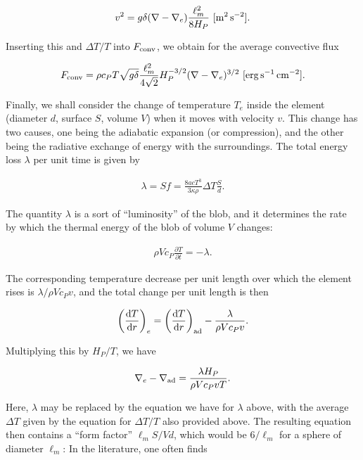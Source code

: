 \documentclass[a4paper,10pt]{article}
\begin{document}
\begin{align*}
    v^2 = g\delta(\nabla-\nabla_e)\frac{\ell_m^2}{8H_P} ~ [{\rm m^2\,s^{-2}}].
\end{align*}

{\noindent}Inserting this and $\Delta T/T$ into $F_{\rm conv}$, we obtain for the average convective flux

\begin{align*}
    F_{\rm conv} = \rho c_PT\sqrt{g\delta}\frac{\ell_m^2}{4\sqrt{2}} H_P^{-3/2}(\nabla-\nabla_e)^{3/2} ~ [{\rm erg\,s^{-1}\,cm^{-2}}].
\end{align*}

{\noindent}Finally, we shall consider the change of temperature $T_e$ inside the element (diameter $d$, surface $S$, volume $V$) when it moves with velocity $v$. This change has two causes, one being the adiabatic expansion (or compression), and the other being the radiative exchange of energy with the surroundings. The total energy loss $\lambda$ per unit time is given by

\begin{align*}
    \lambda = Sf = \frac{8acT^3}{3\kappa\rho}\Delta T\frac{S}{d}.
\end{align*}

{\noindent}The quantity $\lambda$ is a sort of ``luminosity'' of the blob, and it determines the rate by which the thermal energy of the blob of volume $V$ changes:

\begin{align*}
    \rho Vc_P \frac{\partial T}{\partial t} = -\lambda.
\end{align*}

The corresponding temperature decrease per unit length over which the element rises is $\lambda/\rho Vc_Pv$, and the total change per unit length is then

\begin{align*}
    \left(\frac{{\rm d}T}{{\rm d}r}\right)_e = \left(\frac{{\rm d}T}{{\rm d}r}\right)_{\rm ad} - \frac{\lambda}{\rho Vc_Pv}.
\end{align*}

{\noindent}Multiplying this by $H_P/T$, we have

\begin{align*}
    \nabla_e-\nabla_{\rm ad} = \frac{\lambda H_P}{\rho Vc_PvT}.
\end{align*}

{\noindent}Here, $\lambda$ may be replaced by the equation we have for $\lambda$ above, with the average $\Delta T$ given by the equation for $\Delta T/T$ also provided above. The resulting equation then contains a ``form factor'' $\ell_mS/Vd$, which would be $6/\ell_m$ for a sphere of diameter $\ell_m$: In the literature, one often finds 
\end{document}
